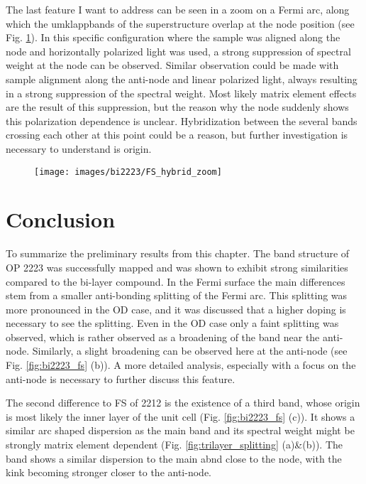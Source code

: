 The last feature I want to address can be seen in a zoom on a Fermi arc, along which the umklappbands of the superstructure overlap at the node position (see Fig. \ref{fig:fs_hybrid}).
In this specific configuration where the sample was aligned along the node and horizontally polarized light was used, a strong suppression of spectral weight at the node can be observed.
Similar observation could be made with sample alignment along the anti-node and linear polarized light, always resulting in a strong suppression of the spectral weight.
Most likely matrix element effects are the result of this suppression, but the reason why the node suddenly shows this polarization dependence is unclear.
Hybridization between the several bands crossing each other at this point could be a reason, but further investigation is necessary to understand is origin.

\begin{figure}[h!]
	\centering
	\texttt{[image: images/bi2223/FS\_hybrid\_zoom]}
	\caption{}
	\label{fig:fs_hybrid}
\end{figure}

\section{Conclusion}

To summarize the preliminary results from this chapter.
The band structure of OP 2223 was successfully mapped and was shown to exhibit strong similarities compared to the bi-layer compound.
In the Fermi surface the main differences stem from a smaller anti-bonding splitting of the Fermi arc.
This splitting was more pronounced in the OD case, and it was discussed that a higher doping is necessary to see the splitting.
Even in the OD case only a faint splitting was observed, which is rather observed as a broadening of the band near the anti-node.
Similarly, a slight broadening can be observed here at the anti-node (see Fig. \ref{fig:bi2223_fs} (b)).
A more detailed analysis, especially with a focus on the anti-node is necessary to further discuss this feature.

The second difference to FS of 2212 is the existence of a third band, whose origin is most likely the inner  layer of the unit cell (Fig. \ref{fig:bi2223_fs} (c)).
It shows a similar arc shaped dispersion as the main band and its spectral weight might be strongly matrix element dependent (Fig. \ref{fig:trilayer_splitting} (a)\&(b)).
The band shows a similar dispersion to the main abnd close to the node, with the kink becoming stronger closer to the anti-node.

